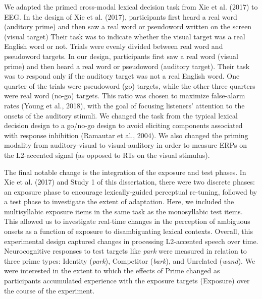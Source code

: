 \documentclass[
  12pt,
  twoside]{article}
\begin{document}
We adapted the primed cross-modal lexical decision task from Xie et al. (2017) to EEG.
In the design of Xie et al. (2017), participants first heard a real word (auditory prime) and then saw a real word or pseudoword written on the screen (visual target)
Their task was to indicate whether the visual target was a real English word or not.
Trials were evenly divided between real word and pseudoword targets.
In our design, participants first saw a real word (visual prime) and then heard a real word or pseudoword (auditory target).
Their task was to respond only if the auditory target was not a real English word.
One quarter of the trials were pseudoword (go) targets, while the other three quarters were real word (no-go) targets.
This ratio was chosen to maximize false-alarm rates (Young et al., 2018), with the goal of focusing listeners' attention to the onsets of the auditory stimuli.
We changed the task from the typical lexical decision design to a go/no-go design to avoid eliciting components associated with response inhibition (Ramautar et al., 2004).
We also changed the priming modality from auditory-visual to visual-auditory in order to measure ERPs on the L2-accented signal (as opposed to RTs on the visual stimulus).

The final notable change is the integration of the exposure and test phases.
In Xie et al. (2017) and Study 1 of this dissertation, there were two discrete phases: an exposure phase to encourage lexically-guided perceptual re-tuning, followed by a test phase to investigate the extent of adaptation.
Here, we included the multisyllabic exposure items in the same task as the monosyllabic test items.
This allowed us to investigate real-time changes in the perception of ambiguous onsets as a function of exposure to disambiguating lexical contexts.
Overall, this experimental design captured changes in processing L2-accented speech over time.
Neurocognitive responses to test targets like \emph{park} were measured in relation to three prime types: Identity (\emph{park}), Competitor (\emph{bark}), and Unrelated (\emph{wand}).
We were interested in the extent to which the effects of Prime changed as participants accumulated experience with the exposure targets (Exposure) over the course of the experiment.
\end{document}
